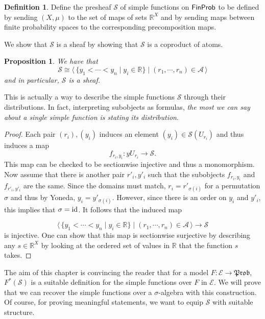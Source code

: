 \documentclass[a4paper]{amsproc}
\theoremstyle{plain}
\newtheorem{proposition}[theorem]{Proposition}
\theoremstyle{definition}
\newtheorem{definition}[theorem]{Definition}
\theoremstyle{remark}
\numberwithin{equation}{section}
\newcommand{\id}{\textup{id}}
\newcommand{\y}{\textit{y}}
\newcommand{\FinProb}{\textup{\textsf{FinProb}}}
\newcommand{\Prob}{\mathfrak{Prob}}
\newcommand{\la}{\langle\,}
\newcommand{\ra}{\,\rangle}
\begin{document}
\begin{definition}
    Define the presheaf $\mathcal{S}$ of simple functions on $\FinProb$ to be defined by sending $(X,\mu)$ to the set of maps of sets $\mathbb{R}^X$ and by sending maps between finite probability spaces to the corresponding precomposition maps.
\end{definition}

We show that $\mathcal{S}$ is a sheaf by showing that $\mathcal{S}$ is a coproduct of atoms.

\begin{proposition}
    We have that
    \[
        \mathcal{S} \cong \la \{y_1 < \cdots < y_n \mid y_i \in \mathbb{R} \} \mid (r_1, \cdots, r_n) \in \mathcal{A} \ra
    \]
    and in particular, $\mathcal{S}$ is a sheaf.
\end{proposition}

This is actually a way to describe the simple functions $\mathcal{S}$ through their distributions. In fact, interpreting subobjects as formulas, \emph{the most we can say about a single simple function is stating its distribution}.

\begin{proof}
    Each pair $(r_i), (y_i)$ induces an element $(y_i) \in \mathcal{S}(U_{r_i})$ and thus induces a map
    \[
        f_{r_i,y_i}: \y U_{r_i} \to \mathcal{S} .
    \]
    This map can be checked to be sectionwise injective and thus a monomorphism. Now assume that there is another pair $r'_i,y'_i$ such that the subobjects $f_{r_i,y_i}$ and $f_{r'_i,y'_i}$ are the same. Since the domains must match, $r_i = r'_{\sigma(i)}$ for a permutation $\sigma$ and thus by Yoneda, $y_i = y'_{\sigma(i)}$. However, since there is an order on $y_i$ and $y'_i$, this implies that $\sigma = \id$. It follows that the induced map

    \[
        \la \{y_1 < \cdots < y_n \mid y_i \in \mathbb{R} \} \mid (r_1, \cdots, r_n) \in \mathcal{A} \ra \to \mathcal{S}
    \]
    is injective. One can show that this map is sectionwise surjective by describing any $s \in \mathbb{R}^X$ by looking at the ordered set of values in $\mathbb{R}$ that the function $s$ takes.
\end{proof}

The aim of this chapter is convincing the reader that for a model $F: \mathcal{E} \to \Prob$, $F^*(\mathcal{S})$ is a suitable definition for the simple functions over $F$ in $\mathcal{E}$. We will prove that we can recover the simple functions over a $\sigma$-algebra with this construction. Of course, for proving meaningful statements, we want to equip $\mathcal{S}$ with suitable structure.
\end{document}
